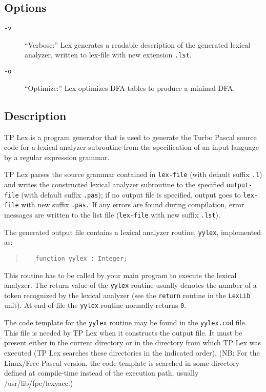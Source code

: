 \subsection{Options}

\begin{description}
   \item[\verb"-v"]
      ``Verbose:'' Lex generates a readable description of the generated
      lexical analyzer, written to lex-file with new extension \verb".lst".
   \item[\verb"-o"]
      ``Optimize:'' Lex optimizes DFA tables to produce a minimal DFA.
\end{description}

\subsection{Description}

TP Lex is a program generator that is used to generate the Turbo Pascal
source code for a lexical analyzer subroutine from the specification
of an input language by a regular expression grammar.

TP Lex parses the source grammar contained in \verb"lex-file" (with default
suffix \verb".l") and writes the constructed lexical analyzer subroutine
to the specified \verb"output-file" (with default suffix \verb".pas"); if no
output file is specified, output goes to \verb"lex-file" with new suffix
\verb".pas." If any errors are found during compilation, error messages are
written to the list file (\verb"lex-file" with new suffix \verb".lst").

The generated output file contains a lexical analyzer routine, \verb"yylex",
implemented as:
\begin{quote}\begin{verbatim}
   function yylex : Integer;
\end{verbatim}\end{quote}

This routine has to be called by your main program to execute the lexical
analyzer. The return value of the \verb"yylex" routine usually denotes the
number of a token recognized by the lexical analyzer (see the \verb"return"
routine in the \verb"LexLib" unit). At end-of-file the \verb"yylex" routine
normally returns \verb"0".

The code template for the \verb"yylex" routine may be found in the
\verb"yylex.cod" file. This file is needed by TP Lex when it constructs the
output file. It must be present either in the current directory or in the
directory from which TP Lex was executed (TP Lex searches these directories in
the indicated order). (NB: For the Linux/Free Pascal version, the code
template is searched in some directory defined at compile-time instead of the
execution path, usually /usr/lib/fpc/lexyacc.)

